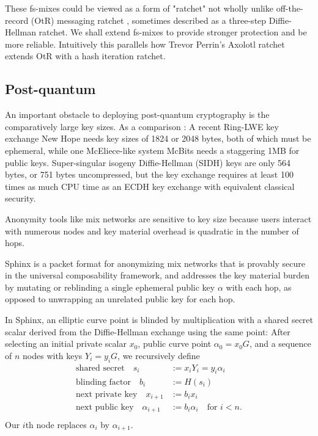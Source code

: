 \documentclass[twoside,letterpaper]{llncs}
\def\mathcomma{}
\begin{document}
These fs-mixes could be viewed as a form of "ratchet" not wholly
unlike off-the-record (OtR) messaging ratchet \cite{OtR},
sometimes described as a three-step Diffie-Hellman ratchet.  
We shall extend fs-mixes to provide stronger protection and be more
reliable.  Intuitively this parallels how Trevor Perrin's Axolotl 
ratchet extends OtR with a hash iteration ratchet. 

\subsection{Post-quantum}

An important obstacle to deploying post-quantum cryptography is
the comparatively large key sizes.  As a comparison : 
%
A recent Ring-LWE key exchange New Hope \cite[\S7, p.10]{NewHope} needs
 key sizes of 1824 or 2048 bytes, both of which must be ephemeral,
while one McEliece-like system McBits %
 needs a staggering 1MB for public keys.
%
Super-singular isogeny Diffie-Hellman (SIDH) \cite[p. 21]{SIDH-2016} keys
are only 564 bytes, or 751 bytes uncompressed, but
 the key exchange requires at least 100 times as much CPU time as
 an ECDH key exchange with equivalent classical security.

Anonymity tools like mix networks are sensitive to key size because 
users interact with numerous nodes and key material overhead is 
quadratic in the number of hops. %

\smallskip

Sphinx \cite{Sphinx} is a packet format for anonymizing mix networks
that is provably secure in the universal composability framework, and
 addresses the key material burden by mutating or reblinding a
 single ephemeral public key $\alpha$ with each hop,
 as opposed to unwrapping an unrelated public key for each hop.

In Sphinx, an elliptic curve point is blinded by multiplication with
a shared secret scalar derived from the Diffie-Hellman exchange using
the same point:
After selecting an initial private scalar $x_0$,
 public curve point $\alpha_0 = x_0 G$, and 
 a sequence of $n$ nodes with keys $Y_i = y_i G$,
we recursively define 
\[ \begin{aligned}
\textrm{shared secret}\quad
 s_i &:= x_i Y_i = y_i \alpha_i \mathcomma \\
\textrm{blinding factor}\quad
 b_i &:= H(s_i) \mathcomma \\
\textrm{next private key}\quad
 x_{i+1} &:= b_i x_i \mathcomma \\ %
\textrm{next public key}\quad
 \alpha_{i+1} &:= b_i \alpha_i \quad\textrm{for $i < n$.} \\
\end{aligned} \]
Our $i$th node replaces $\alpha_i$ by $\alpha_{i+1}$.
\end{document}
